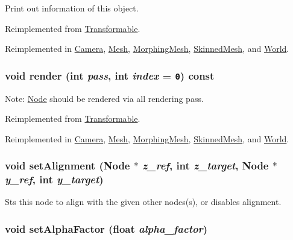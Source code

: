 Print out information of this object. 

Reimplemented from \hyperlink{classm3g_1_1Transformable_6fea17fa1532df3794f8cb39cb4f911f}{Transformable}.

Reimplemented in \hyperlink{classm3g_1_1Camera_6fea17fa1532df3794f8cb39cb4f911f}{Camera}, \hyperlink{classm3g_1_1Mesh_6fea17fa1532df3794f8cb39cb4f911f}{Mesh}, \hyperlink{classm3g_1_1MorphingMesh_6fea17fa1532df3794f8cb39cb4f911f}{MorphingMesh}, \hyperlink{classm3g_1_1SkinnedMesh_6fea17fa1532df3794f8cb39cb4f911f}{SkinnedMesh}, and \hyperlink{classm3g_1_1World_6fea17fa1532df3794f8cb39cb4f911f}{World}.\hypertarget{classm3g_1_1Node_1efcb1973989d9963d5bd6d03065d389}{
\subsubsection[{render}]{\setlength{\rightskip}{0pt plus 5cm}void render (int {\em pass}, \/  int {\em index} = {\tt 0}) const}}
\label{classm3g_1_1Node_1efcb1973989d9963d5bd6d03065d389}


Note: \hyperlink{classm3g_1_1Node}{Node} should be rendered via all rendering pass. 

Reimplemented from \hyperlink{classm3g_1_1Transformable_1efcb1973989d9963d5bd6d03065d389}{Transformable}.

Reimplemented in \hyperlink{classm3g_1_1Camera_1efcb1973989d9963d5bd6d03065d389}{Camera}, \hyperlink{classm3g_1_1Mesh_1efcb1973989d9963d5bd6d03065d389}{Mesh}, \hyperlink{classm3g_1_1MorphingMesh_1efcb1973989d9963d5bd6d03065d389}{MorphingMesh}, \hyperlink{classm3g_1_1SkinnedMesh_1efcb1973989d9963d5bd6d03065d389}{SkinnedMesh}, and \hyperlink{classm3g_1_1World_1efcb1973989d9963d5bd6d03065d389}{World}.\hypertarget{classm3g_1_1Node_dd1627aba90e63c166ecd3d7463d735a}{
\subsubsection[{setAlignment}]{\setlength{\rightskip}{0pt plus 5cm}void setAlignment ({\bf Node} $\ast$ {\em z\_\-ref}, \/  int {\em z\_\-target}, \/  {\bf Node} $\ast$ {\em y\_\-ref}, \/  int {\em y\_\-target})}}
\label{classm3g_1_1Node_dd1627aba90e63c166ecd3d7463d735a}


Sts this node to align with the given other nodes(s), or disables alignment. \hypertarget{classm3g_1_1Node_b33c321ce240770e5eb64d0e20ea61cc}{
\subsubsection[{setAlphaFactor}]{\setlength{\rightskip}{0pt plus 5cm}void setAlphaFactor (float {\em alpha\_\-factor})}}
\label{classm3g_1_1Node_b33c321ce240770e5eb64d0e20ea61cc}


